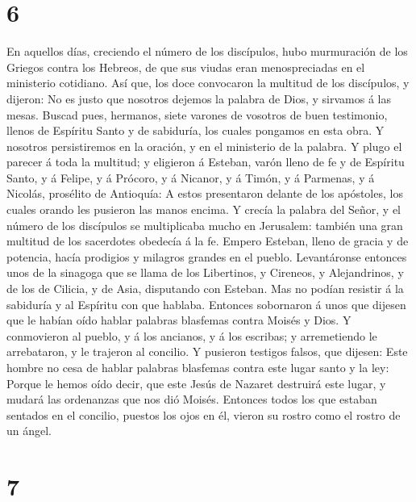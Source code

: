 \hypertarget{section-5}{%
\section{6}\label{section-5}}

 En aquellos días, creciendo el número de los discípulos,
hubo murmuración de los Griegos contra los Hebreos, de que sus viudas
eran menospreciadas en el ministerio cotidiano.  Así que,
los doce convocaron la multitud de los discípulos, y dijeron: No es
justo que nosotros dejemos la palabra de Dios, y sirvamos á las mesas.
 Buscad pues, hermanos, siete varones de vosotros de buen
testimonio, llenos de Espíritu Santo y de sabiduría, los cuales pongamos
en esta obra.  Y nosotros persistiremos en la oración, y en
el ministerio de la palabra.  Y plugo el parecer á toda la
multitud; y eligieron á Esteban, varón lleno de fe y de Espíritu Santo,
y á Felipe, y á Prócoro, y á Nicanor, y á Timón, y á Parmenas, y á
Nicolás, prosélito de Antioquía:  A estos presentaron
delante de los apóstoles, los cuales orando les pusieron las manos
encima.  Y crecía la palabra del Señor, y el número de los
discípulos se multiplicaba mucho en Jerusalem: también una gran multitud
de los sacerdotes obedecía á la fe.  Empero Esteban, lleno
de gracia y de potencia, hacía prodigios y milagros grandes en el
pueblo.  Levantáronse entonces unos de la sinagoga que se
llama de los Libertinos, y Cireneos, y Alejandrinos, y de los de
Cilicia, y de Asia, disputando con Esteban.  Mas no podían
resistir á la sabiduría y al Espíritu con que hablaba. 
Entonces sobornaron á unos que dijesen que le habían oído hablar
palabras blasfemas contra Moisés y Dios.  Y conmovieron al
pueblo, y á los ancianos, y á los escribas; y arremetiendo le
arrebataron, y le trajeron al concilio.  Y pusieron
testigos falsos, que dijesen: Este hombre no cesa de hablar palabras
blasfemas contra este lugar santo y la ley:  Porque le
hemos oído decir, que este Jesús de Nazaret destruirá este lugar, y
mudará las ordenanzas que nos dió Moisés.  Entonces todos
los que estaban sentados en el concilio, puestos los ojos en él, vieron
su rostro como el rostro de un ángel.

\hypertarget{section-6}{%
\section{7}\label{section-6}}

